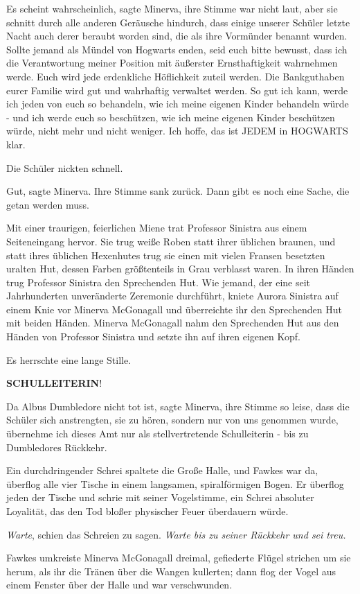 \glqq{}Es scheint wahrscheinlich\grqq{}, sagte Minerva, ihre Stimme war nicht
laut, aber sie schnitt durch alle anderen Geräusche hindurch, \glqq{}dass einige
unserer Schüler letzte Nacht auch derer beraubt worden sind, die als ihre
Vormünder benannt wurden. Sollte jemand als Mündel von Hogwarts enden, seid euch
bitte bewusst, dass ich die Verantwortung meiner Position mit äußerster
Ernsthaftigkeit wahrnehmen werde. Euch wird jede erdenkliche Höflichkeit zuteil
werden. Die Bankguthaben eurer Familie wird gut und wahrhaftig verwaltet werden.
So gut ich kann, werde ich jeden von euch so behandeln, wie ich meine eigenen
Kinder behandeln würde - und ich werde euch so beschützen, wie ich meine eigenen
Kinder beschützen würde, nicht mehr und nicht weniger. Ich hoffe, das ist JEDEM
in HOGWARTS klar.\grqq{}

Die Schüler nickten schnell.

\glqq{}Gut\grqq{}, sagte Minerva. Ihre Stimme sank zurück. \glqq{}Dann gibt es
noch eine Sache, die getan werden muss.\grqq{}

Mit einer traurigen, feierlichen Miene trat Professor Sinistra aus einem
Seiteneingang hervor. Sie trug weiße Roben statt ihrer üblichen braunen, und
statt ihres üblichen Hexenhutes trug sie einen mit vielen Fransen besetzten
uralten Hut, dessen Farben größtenteils in Grau verblasst waren. In ihren Händen
trug Professor Sinistra den Sprechenden Hut. Wie jemand, der eine seit
Jahrhunderten unveränderte Zeremonie durchführt, kniete Aurora Sinistra auf
einem Knie vor Minerva McGonagall und überreichte ihr den Sprechenden Hut mit
beiden Händen. Minerva McGonagall nahm den Sprechenden Hut aus den Händen von
Professor Sinistra und setzte ihn auf ihren eigenen Kopf.

Es herrschte eine lange Stille.

\glqq{}\textbf{SCHULLEITERIN}!\grqq{}

\glqq{}Da Albus Dumbledore nicht tot ist\grqq{}, sagte Minerva, ihre Stimme so
leise, dass die Schüler sich anstrengten, sie zu hören, \glqq{}sondern nur von
uns genommen wurde, übernehme ich dieses Amt nur als stellvertretende
Schulleiterin - bis zu Dumbledores Rückkehr.\grqq{}

Ein durchdringender Schrei spaltete die Große Halle, und Fawkes war da, überflog
alle vier Tische in einem langsamen, spiralförmigen Bogen. Er überflog jeden der
Tische und schrie mit seiner Vogelstimme, ein Schrei absoluter Loyalität, das
den Tod bloßer physischer Feuer überdauern würde.

\emph{Warte}, schien das Schreien zu sagen. \emph{Warte bis zu seiner Rückkehr
und sei treu.}

Fawkes umkreiste Minerva McGonagall dreimal, gefiederte Flügel strichen um sie
herum, als ihr die Tränen über die Wangen kullerten; dann flog der Vogel aus
einem Fenster über der Halle und war verschwunden.

